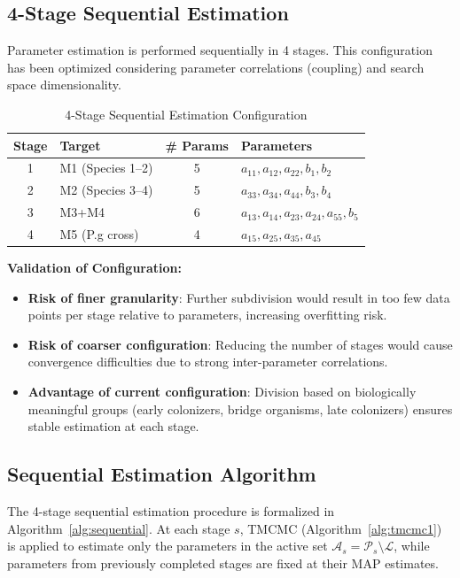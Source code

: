 \documentclass[11pt,a4paper]{article}
\begin{document}
\subsection{4-Stage Sequential Estimation}

Parameter estimation is performed sequentially in 4 stages. This configuration has been optimized considering parameter correlations (coupling) and search space dimensionality.

\begin{table}[h]
\centering
\small
\begin{tabular}{clcl}
\toprule
\textbf{Stage} & \textbf{Target} & \textbf{\# Params} & \textbf{Parameters} \\
\midrule
1 & M1 (Species 1--2) & 5 & $a_{11}, a_{12}, a_{22}, b_1, b_2$ \\
2 & M2 (Species 3--4) & 5 & $a_{33}, a_{34}, a_{44}, b_3, b_4$ \\
3 & M3+M4 & 6 & $a_{13}, a_{14}, a_{23}, a_{24}, a_{55}, b_5$ \\
4 & M5 (P.g cross) & 4 & $a_{15}, a_{25}, a_{35}, a_{45}$ \\
\bottomrule
\end{tabular}
\caption{4-Stage Sequential Estimation Configuration}
\label{tab:stages}
\end{table}

\textbf{Validation of Configuration:}
\begin{itemize}
    \item \textbf{Risk of finer granularity}: Further subdivision would result in too few data points per stage relative to parameters, increasing overfitting risk.

    \item \textbf{Risk of coarser configuration}: Reducing the number of stages would cause convergence difficulties due to strong inter-parameter correlations.

    \item \textbf{Advantage of current configuration}: Division based on biologically meaningful groups (early colonizers, bridge organisms, late colonizers) ensures stable estimation at each stage.
\end{itemize}

\subsection{Sequential Estimation Algorithm}
\label{sec:sequential_algorithm}

The 4-stage sequential estimation procedure is formalized in Algorithm~\ref{alg:sequential}. At each stage $s$, TMCMC (Algorithm~\ref{alg:tmcmc1}) is applied to estimate only the parameters in the active set $\mathcal{A}_s = \mathcal{P}_s \setminus \mathcal{L}$, while parameters from previously completed stages are fixed at their MAP estimates.
\end{document}

